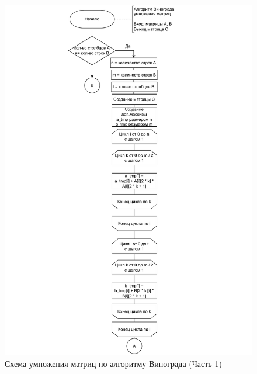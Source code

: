\begin{figure}[h]
	\centering
	\includegraphics[width=1\linewidth]{img/vinograd_alg_1.pdf}
	\caption{Схема умножения матриц по алгоритму Винограда (Часть 1)}
	\label{img:vinograd_alg_1}
\end{figure}

